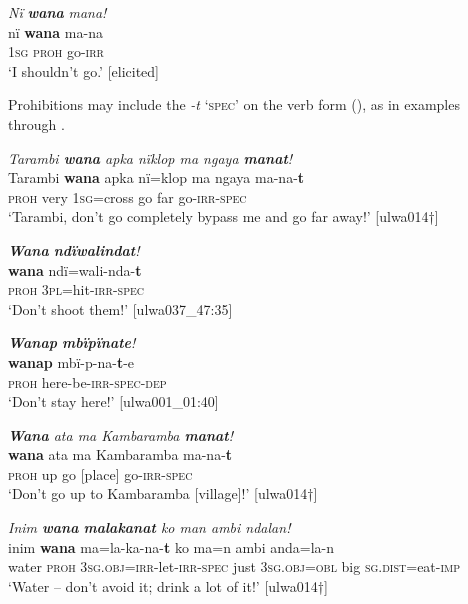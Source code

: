 \ea%
    \label{ex:syntax:109}
          \textit{Nï} \textbf{\textit{wana}} \textit{mana!}\\
\gll    nï    \textbf{wana}  ma-na\\
    \textsc{1sg}  \textsc{proh}  go-\textsc{irr}\\
\glt `I shouldn’t go.’ [elicited]
\z

Prohibitions may include the   \textit{-t} ‘\textsc{spec}’ on the  verb form (), as in examples  through .

\ea%
    \label{ex:syntax:110}
          \textit{Tarambi \textbf{wana} apka nïklop ma ngaya \textbf{manat}!}\\
\gll    Tarambi  \textbf{wana}  apka  nï=klop  ma  ngaya  ma-na-\textbf{t}\\
    [name]    \textsc{proh}  very  1\textsc{sg}=cross  go  far    go-\textsc{irr-spec}\\
\glt `Tarambi, don’t go completely bypass me and go far away!’ [ulwa014†]
\z

\ea%
    \label{ex:syntax:111}
          \textit{\textbf{Wana} \textbf{ndïwalindat}!}\\
\gll    \textbf{wana}  ndï=wali-nda-\textbf{t}\\
    \textsc{proh}  3\textsc{pl}=hit-\textsc{irr-spec}\\
\glt `Don’t shoot them!’ [ulwa037\_47:35]
\z

\ea%
    \label{ex:syntax:112}
          \textit{\textbf{Wanap} \textbf{mbïpïnate}!}\\
\gll    \textbf{wanap}  mbï-p-na-\textbf{t}-e\\
    \textsc{proh}  here-be-\textsc{irr-spec-dep}\\
\glt `Don’t stay here!’ [ulwa001\_01:40]
\z

\ea%
    \label{ex:syntax:113}
          \textit{\textbf{Wana} ata ma Kambaramba \textbf{manat}!}\\
\gll    \textbf{wana}  ata  ma  Kambaramba  ma-na-\textbf{t}\\
    \textsc{proh}  up  go  [place]      go-\textsc{irr-spec}\\
\glt `Don’t go up to Kambaramba [village]!’ [ulwa014†]
\z

\ea%
    \label{ex:syntax:114}
          \textit{Inim \textbf{wana} \textbf{malakanat} ko man ambi ndalan!}\\
\gll    inim  \textbf{wana}  ma=la-ka-na-\textbf{t}          ko  ma=n      ambi     anda=la-n\\
    water  \textsc{proh}  3\textsc{sg.obj}=\textsc{irr}{}-let-\textsc{irr-spec}  just  3\textsc{sg.obj=obl}  big    \textsc{sg.dist}=eat-\textsc{imp}\\
\glt `Water -- don’t avoid it; drink a lot of it!’ [ulwa014†]
\z

